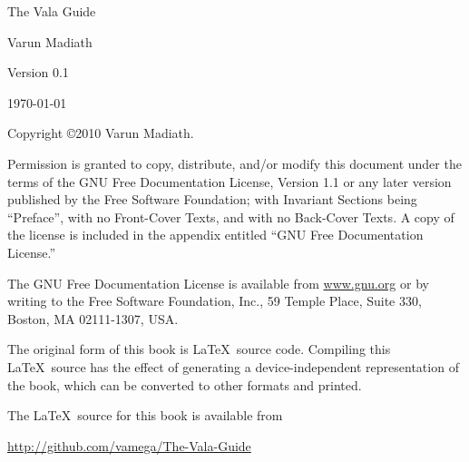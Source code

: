 \documentclass[openany]{book}
\begin{document}
\pagebreak
\thispagestyle{empty}

\begin{flushright}
\vspace*{2.5in}

{\huge The Vala Guide}

\vspace{1in}

{\Large
Varun Madiath
}


\vspace{1in}

{\Large Version 0.1}

{\small \today}

\vfill

\end{flushright}

\pagebreak
\thispagestyle{empty}

Copyright \copyright 2010 Varun Madiath.

\vspace{0.25in}

Permission is granted to copy, distribute, and/or modify this document
under the terms of the GNU Free Documentation License, Version 1.1 or
any later version published by the Free Software Foundation; with
Invariant Sections being ``Preface'', with no Front-Cover Texts, and
with no Back-Cover Texts.  A copy of the license is included in the
appendix entitled ``GNU Free Documentation License.''

The GNU Free Documentation License is available from \url{www.gnu.org}
or by writing to the Free Software Foundation, Inc., 59 Temple Place,
Suite 330, Boston, MA 02111-1307, USA.

The original form of this book is \LaTeX\ source code.  Compiling this
\LaTeX\ source has the effect of generating a device-independent
representation of the book, which can be converted to other formats
and printed.

The \LaTeX\ source for this book is available from

\hspace{0.25in}\url{http://github.com/vamega/The-Vala-Guide}

\vspace{0.25in}

\fontsize{12pt}{18pt}\selectfont
\tableofcontents



\end{document}
